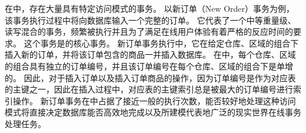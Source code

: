 
在{\tpcc}中，存在大量具有特定访问模式的事务。
以新订单（New Order）事务为例，该事务执行过程中将向数据库输入一个完整的订单。
它代表了一个中等重量级、读写混合的事务，频繁被执行并且为了满足在线用户体验有着严格的反应时间的要求。
这个事务是{\tpcc}的核心事务。
新订单事务执行中，它在给定仓库、区域的组合下插入新的订单，并将该订单包含的商品一并插入数据库。
在{\tpcc}中，每个仓库、区域的组合具有独立的订单编号，并且该订单编号在每个仓库、区域的组合下是单增的。
因此，对于插入订单以及插入订单商品的操作，因为订单编号是作为对应表的主键之一，因此在插入过程中，对应表的主键索引总是被最大的订单编号进行索引操作。
新订单事务在{\tpcc}中占据了接近一般的执行次数，能否较好地处理这种访问模式将直接决定数据库能否高效地完成{\tpcc}以及{\tpcc}所建模代表地广泛的现实世界在线事务处理任务。


